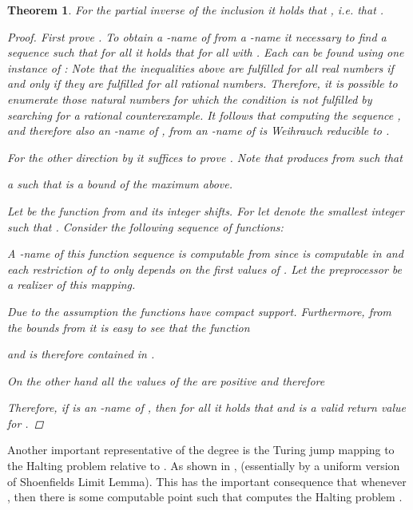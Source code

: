 \documentclass{eptcs-modified}
\newtheorem{theorem}{Theorem}
\begin{document}
			\begin{theorem}
				For the partial inverse  of the inclusion  it holds that , i.e. that .
				\begin{proof}
					First prove .
					To obtain a -name of  from a -name it necessary to find a sequence  such that for all  it holds that  for all  with .
					Each  can be found using one instance of :
					Note that the inequalities above are fulfilled for all real numbers if and only if they are fulfilled for all rational numbers.
					Therefore, it is possible to enumerate those natural numbers  for which the condition is not fulfilled by searching for a rational counterexample.
					It follows that computing the sequence , and therefore also an -name of , from an -name of  is Weihrauch reducible to .

					For the other direction by  it suffices to prove .
					Note that  produces from  such that
					
					a  such that  is a bound of the maximum above.

					Let  be the function from  and  its integer shifts.
					For  let  denote the smallest integer such that .
					Consider the following sequence of functions:
					
					A -name of this function sequence is computable from  since  is computable in  and each restriction of  to  only depends on the first  values of .
					Let the preprocessor  be a realizer of this mapping.

					Due to the assumption  the functions  have compact support.
					Furthermore, from the bounds from  it is easy to see that the function
					
					and is therefore contained in .

					On the other hand all the values of the  are positive and therefore
					
					Therefore, if  is an -name of , then for all  it holds that  and  is a valid return value for .
				\end{proof}
			\end{theorem}
			
			Another important representative of the degree  is the Turing jump  mapping  to the Halting problem relative to .
			As shown in \cite{brattka2},  (essentially by a uniform version of Shoenfields Limit Lemma).
			This has the important consequence that whenever , then there is some computable point  such that  computes the Halting problem \cite{brattka11}.
\end{document}
